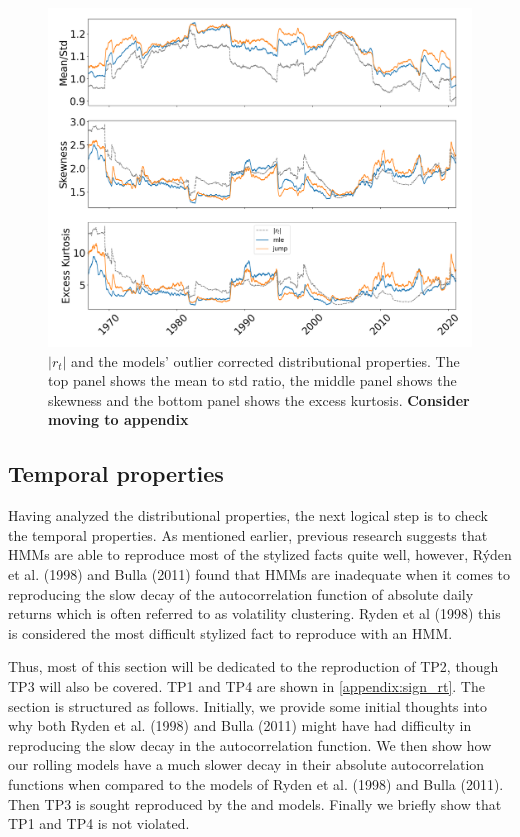 \begin{figure}[H] 
    \centering
    \includegraphics[width=1.0\textwidth]{analysis/stylized_facts/images/moments_bulla_abs_outlier.png}
    \caption[$|r_t|$ and the models' outlier corrected distributional properties]{$|r_t|$ and the models' outlier corrected distributional properties. The top panel shows the mean to std ratio, the middle panel shows the skewness and the bottom panel shows the excess kurtosis. \textbf{Consider moving to appendix}}
    \label{fig:stylized_facts_moments_bulla_abs_outliers} 
\end{figure}

\subsection{Temporal properties}
\label{Sec: Temporal properties}

Having analyzed the distributional properties, the next logical step is to check the temporal properties. As mentioned earlier, previous research suggests that HMMs are able to reproduce most of the stylized facts quite well, however, Rýden et al. (1998) and Bulla (2011) found that HMMs are inadequate when it comes to reproducing the slow decay of the autocorrelation function of absolute daily returns which is often referred to as volatility clustering. Ryden et al (1998) this is considered the most difficult stylized fact to reproduce with an HMM.

Thus, most of this section will be dedicated to the reproduction of TP2, though TP3 will also be covered. TP1 and TP4 are shown in \cref{appendix:sign_rt}. The section is structured as follows. Initially, we provide some initial thoughts into why both Ryden et al. (1998) and Bulla (2011) might have had difficulty in reproducing the slow decay in the autocorrelation function. We then show how our rolling models have a much slower decay in their absolute autocorrelation functions when compared to the models of Ryden et al. (1998) and Bulla (2011). Then TP3 is sought reproduced by the \mle and \jump models. Finally we briefly show that TP1 and TP4 is not violated.

